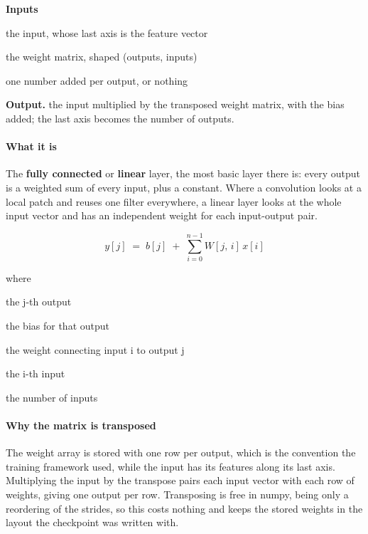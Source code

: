 \noindent\textbf{Inputs}
\begin{description}[leftmargin=2.2em,style=nextline,font=\normalfont\ttfamily]\setlength\itemsep{1pt}
  \item[{x}] \normalfont the input, whose last axis is the feature vector
  \item[{weight}] \normalfont the weight matrix, shaped (outputs, inputs)
  \item[{bias}] \normalfont one number added per output, or nothing
\end{description}

\noindent\textbf{Output.} the input multiplied by the transposed weight matrix, with the bias added; the last axis becomes the number of outputs.


\paragraph{What it is}
The \textbf{fully connected} or \textbf{linear} layer, the most basic layer there is: every output is a weighted sum of every input, plus a constant. Where a convolution looks at a local patch and reuses one filter everywhere, a linear layer looks at the whole input vector and has an independent weight for each input-output pair.


\begin{equation}
y[j] \;=\; b[j] \;+\; \sum_{i=0}^{n-1} W[j,\,i] \, x[i]
\end{equation}

\noindent where
\begin{description}[leftmargin=2.4em,style=nextline,font=\normalfont\ttfamily]\setlength\itemsep{1pt}
  \item[{$y[j]$}] \normalfont the j-th output
  \item[{$b[j]$}] \normalfont the bias for that output
  \item[{$W[j,i]$}] \normalfont the weight connecting input i to output j
  \item[{$x[i]$}] \normalfont the i-th input
  \item[{$n$}] \normalfont the number of inputs
\end{description}

\paragraph{Why the matrix is transposed}
The weight array is stored with one row per output, which is the convention the training framework used, while the input has its features along its last axis. Multiplying the input by the transpose pairs each input vector with each row of weights, giving one output per row. Transposing is free in numpy, being only a reordering of the strides, so this costs nothing and keeps the stored weights in the layout the checkpoint was written with.


